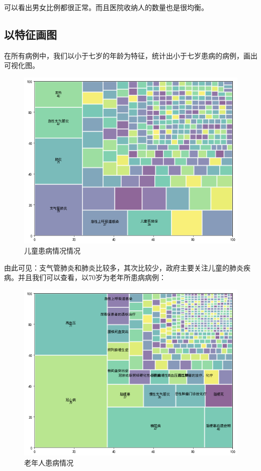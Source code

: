 \documentclass[12pt]{article}
\begin{document}
可以看出男女比例都很正常。而且医院收纳人的数量也是很均衡。

\subsection{以特征画图}

在所有病例中，我们以小于七岁的年龄为特征，统计出小于七岁患病的病例，画出可视化图。

\begin{figure}[ht]
\centering
\includegraphics[scale=0.5]{figures/12.png}
\caption{儿童患病情况情况}\label{fig:label2}
\end{figure}

由此可见：支气管肺炎和肺炎比较多，其次比较少，政府主要关注儿童的肺炎疾病。并且我们可以查看，以70岁为老年所患病病例：

\begin{figure}[ht]
\centering
\includegraphics[scale=0.5]{figures/13.png}
\caption{老年人患病情况}\label{fig:label2}
\end{figure}
\end{document}
